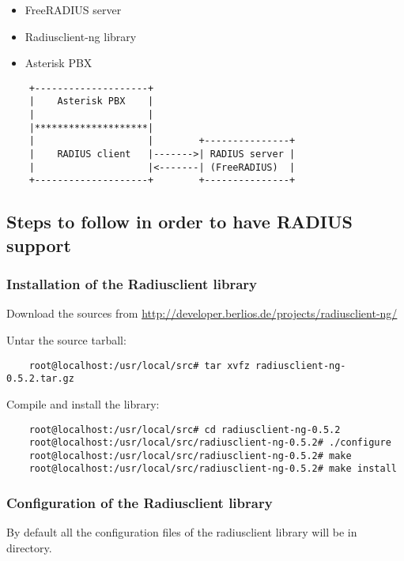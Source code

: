 \begin{itemize}
	\item FreeRADIUS server
	\item Radiusclient-ng library
	\item Asterisk PBX
\end{itemize}

\begin{verbatim}
	+--------------------+
	|    Asterisk PBX    |
	|                    |
	|********************|
	|                    |        +---------------+
	|    RADIUS client   |------->| RADIUS server |
	|                    |<-------| (FreeRADIUS)  |
	+--------------------+        +---------------+
\end{verbatim}



\subsection{Steps to follow in order to have RADIUS support}

\subsubsection{Installation of the Radiusclient library}

	Download the sources from	
	\url{http://developer.berlios.de/projects/radiusclient-ng/}
		
	Untar the source tarball:

\begin{verbatim}
	root@localhost:/usr/local/src# tar xvfz radiusclient-ng-0.5.2.tar.gz
\end{verbatim}

	Compile and install the library:

\begin{verbatim}
	root@localhost:/usr/local/src# cd radiusclient-ng-0.5.2
	root@localhost:/usr/local/src/radiusclient-ng-0.5.2# ./configure
	root@localhost:/usr/local/src/radiusclient-ng-0.5.2# make
	root@localhost:/usr/local/src/radiusclient-ng-0.5.2# make install
\end{verbatim}

\subsubsection{Configuration of the Radiusclient library}
	
	By default all the configuration files of the radiusclient library will
	be in  directory.
		
